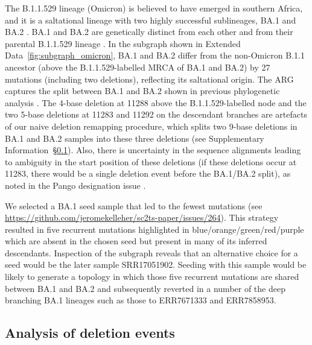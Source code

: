 \documentclass[12pt]{article}
\newcommand{\supref}[1]{Supplementary Information~\S\ref{#1}}
\newcommand{\edref}[1]{Extended Data~\ref{#1}}
\begin{document}
The B.1.1.529 lineage (Omicron)
is believed to have emerged in southern Africa, and
it is a saltational lineage with two highly successful sublineages,
BA.1 and BA.2 \cite{Dor2025}.
BA.1 and BA.2 are genetically distinct from each other and
from their parental B.1.1.529 lineage \cite{RambautOmicron2021}.
In the subgraph shown in \edref{fig:subgraph_omicron},
BA.1 and BA.2 differ from the non-Omicron B.1.1 ancestor
(above the B.1.1.529-labelled MRCA of BA.1 and BA.2)
by 27 mutations (including two deletions),
reflecting its saltational origin.
The ARG captures the split between BA.1 and BA.2
shown in previous phylogenetic analysis \cite{Dor2025}.
The 4-base deletion at 11288 above the B.1.1.529-labelled node and
the two 5-base deletions at 11283 and 11292 on the descendant branches
are artefacts of our naive deletion remapping procedure,
which splits two 9-base deletions in BA.1 and BA.2 samples
into these three deletions
(see \supref{sec:supplement_dels}).
Also, there is uncertainty in the sequence alignments
leading to ambiguity in the start position of these deletions
(if these deletions occur at 11283,
there would be a single deletion event before the BA.1/BA.2 split),
as noted in the Pango designation issue \cite{RambautOmicron2021}.

We selected a BA.1 seed sample that led to the fewest mutations (see \url{https://github.com/jeromekelleher/sc2ts-paper/issues/264}).
This strategy resulted in five recurrent mutations
highlighted in blue/orange/green/red/purple
which are absent in the chosen seed
but present in many of its inferred descendants.
Inspection of the subgraph reveals that an alternative choice for a seed would be the later sample SRR17051902. Seeding with this sample would be likely to generate a topology
in which those five recurrent mutations are shared between BA.1 and BA.2 and subsequently reverted in a number of the deep branching BA.1 lineages such as those to ERR7671333 and ERR7858953.



\subsection{Analysis of deletion events}
\label{sec:supplement_dels}
\end{document}
